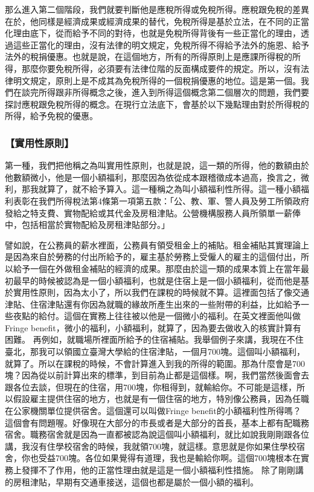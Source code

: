 \documentclass[oneside,sub3section]{ctexbook}
\begin{document}
那么進入第二個階段，我們就要判斷他是應稅所得或免稅所得。應稅跟免稅的差異在於，他同樣是經濟成果或經濟成果的替代，免稅所得是基於立法，在不同的正當化理由底下，從而給予不同的對待，也就是免稅所得背後有一些正當化的理由，透過這些正當化的理由，沒有法律的明文規定，免稅所得不得給予法外的施恩、給予法外的稅捐優惠。也就是說，在這個地方，所有的所得原則上是應課所得稅的所得，那麼你要免稅所得，必須要有法律位階的反面構成要件的規定。所以，沒有法律明文規定，原則上是不成其為免稅所得的一個稅捐優惠的地位。這是第一個。我們在談完所得跟非所得概念之後，進入到所得這個概念第二個層次的問題，我們要探討應稅跟免稅所得的概念。在現行立法底下，會基於以下幾點理由對於所得稅的所得，給予免稅的優惠。

\hypertarget{ux5be6ux7528ux6027ux539fux5247}{%
\subsubsection{【實用性原則】}\label{ux5be6ux7528ux6027ux539fux5247}}

第一種，我們把他稱之為叫實用性原則，也就是說，這一類的所得，他的數額由於他數額微小，他是一個小額福利，那麼因為依從成本跟稽徵成本過高，換言之，微利，那我就算了，就不給予算入。這一種稱之為叫小額福利性所得。這一種小額福利表彰在我們所得稅法第4條第一項第五款：「公、教、軍、警人員及勞工所領政府發給之特支費、實物配給或其代金及房租津貼。公營機構服務人員所領單一薪俸中，包括相當於實物配給及房租津貼部分。」

譬如說，在公務員的薪水裡面，公務員有領受租金上的補貼。租金補貼其實理論上是因為來自於勞務的付出所給予的，雇主基於勞務上受僱人的雇主的這個付出，所以給予一個在外做租金補貼的經濟的成果。那麼由於這一類的成果本質上在當年最初最早的時候被認為是一個小額福利，也就是住宿上是一個小額福利，從而他是基於實用性原則，因為太小了，所以我們在課稅的時候就不算。這裡面包括了像交通津貼、住宿津貼還有你因為就職的緣故所產生出來的一些附帶的利益，比如給予一些夜點的給付。這個在實務上往往被以他是一個微小的福利。在英文裡面他叫做Fringe benefit，微小的福利，小額福利，就算了，因為要去做收入的核實計算有困難。
再例如，就職場所裡面所給予的住宿補貼。我舉個例子來講，我現在不住臺北，那我可以領國立臺灣大學給的住宿津貼，一個月700塊。這個叫小額福利，就算了。所以在課稅的時候，不會計算進入到我的所得的範圍。那為什麼會是700塊？因為從以前計算出來的標準，到目前為止都是這個樣。啊，我們當然後面會去跟各位去談，但現在的住宿，用700塊，你租得到，就輸給你。不可能是這樣，所以假設雇主提供住宿的地方，也就是有一個住宿的地方，特別像公務員，因為任職在公家機關單位提供宿舍。這個還可以叫做Fringe benefit的小額福利性所得嗎？這個會有問題喔。好像現在大部分的市長或者是大部分的首長，基本上都有配職務宿舍。職務宿舍就是因為一直都被認為說這個叫小額福利，就比如說我剛剛跟各位講，我沒有住學校宿舍的時候，我就領700塊，就這樣。意思就是你如果住學校宿舍，你也受益700塊。各位如果覺得有道理，我也是輸給你啊。這個700塊根本在實務上發揮不了作用，他的正當性理由就是這是一個小額福利性措施。
除了剛剛講的房租津貼，早期有交通車接送，這個也都是屬於一個小額的福利。
\end{document}
